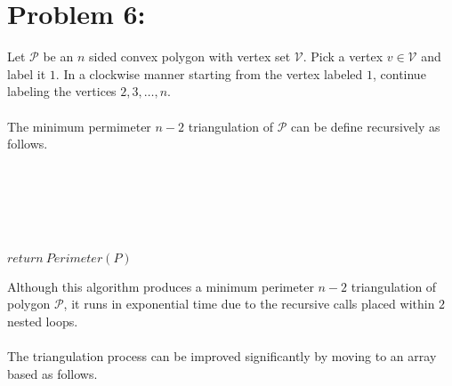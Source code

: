 \documentclass[12pt]{article}
\begin{document}
\section*{Problem 6: }
Let $\mathcal{P}$ be an $n$ sided convex polygon with vertex set
$\mathcal{V}$.  Pick a vertex $v\in\mathcal{V}$ and label it $1$.
In a clockwise manner starting from the vertex labeled $1$, continue
labeling the vertices $2,3,\dots,n$.\\\\
The minimum permimeter $n-2$ triangulation of $\mathcal{P}$ can be
define recursively as follows.\\\\
\begin{algorithm}[H]
\\
\\
\\
\\
{$return\ Perimeter(P)$}
\end{algorithm}
Although this algorithm produces a minimum perimeter $n-2$ triangulation of
polygon $\mathcal{P}$, it runs in exponential time due to the recursive calls
placed within $2$ nested loops.\\\\
The triangulation process can be improved significantly by moving to an
array based as follows.\\\\
\end{document}
